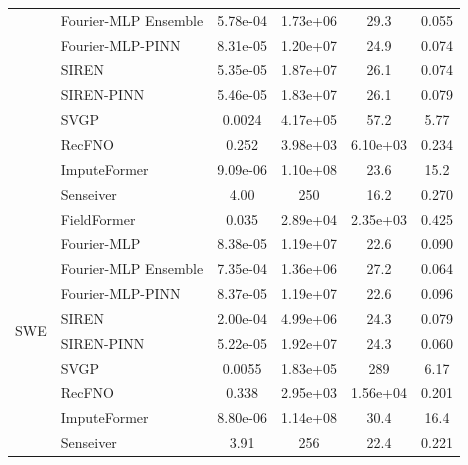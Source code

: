 \begin{table}[htbp]
{\begin{tabular}{llcccc}
& Fourier-MLP Ensemble & 5.78e-04 & 1.73e+06 & 29.3 & 0.055 \\
& Fourier-MLP-PINN & 8.31e-05 & 1.20e+07 & 24.9 & 0.074 \\
& SIREN & 5.35e-05 & 1.87e+07 & 26.1 & 0.074 \\
& SIREN-PINN & 5.46e-05 & 1.83e+07 & 26.1 & 0.079 \\
& SVGP & 0.0024 & 4.17e+05 & 57.2 & 5.77 \\
& RecFNO & 0.252 & 3.98e+03 & 6.10e+03 & 0.234 \\
& ImputeFormer & 9.09e-06 & 1.10e+08 & 23.6 & 15.2 \\
& Senseiver & 4.00 & 250 & 16.2 & 0.270 \\
\midrule
\multirow{10}{*}{SWE}
& FieldFormer & 0.035 & 2.89e+04 & 2.35e+03 & 0.425 \\
& Fourier-MLP & 8.38e-05 & 1.19e+07 & 22.6 & 0.090 \\
& Fourier-MLP Ensemble & 7.35e-04 & 1.36e+06 & 27.2 & 0.064 \\
& Fourier-MLP-PINN & 8.37e-05 & 1.19e+07 & 22.6 & 0.096 \\
& SIREN & 2.00e-04 & 4.99e+06 & 24.3 & 0.079 \\
& SIREN-PINN & 5.22e-05 & 1.92e+07 & 24.3 & 0.060 \\
& SVGP & 0.0055 & 1.83e+05 & 289 & 6.17 \\
& RecFNO & 0.338 & 2.95e+03 & 1.56e+04 & 0.201 \\
& ImputeFormer & 8.80e-06 & 1.14e+08 & 30.4 & 16.4 \\
& Senseiver & 3.91 & 256 & 22.4 & 0.221 \\
\bottomrule
\end{tabular}%
}
\end{table}

